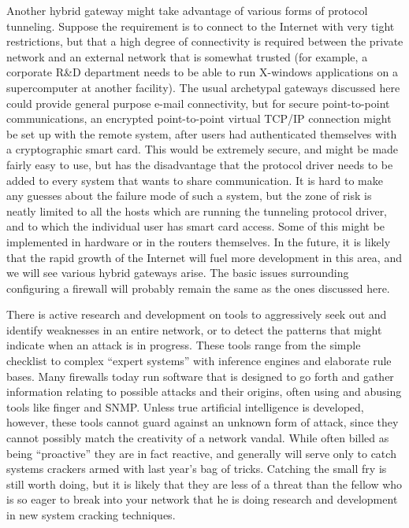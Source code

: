 \begin{htmllist}
    Another hybrid gateway might take advantage of various forms of
    protocol tunneling. Suppose the requirement is to connect to the
    Internet with very tight restrictions, but that a high degree of
    connectivity is required between the private network and an external
    network that is somewhat trusted (for example, a corporate R\&D
    department needs to be able to run X-windows applications on a
    supercomputer at another facility). The usual archetypal gateways
    discussed here could provide general purpose e-mail connectivity, but
    for secure point-to-point communications, an encrypted point-to-point
    virtual TCP/IP connection might be set up with the remote system, after
    users had authenticated themselves with a cryptographic smart card.
    This would be extremely secure, and might be made fairly easy to use,
    but has the disadvantage that the protocol driver needs to be added to
    every system that wants to share communication. It is hard to make any
    guesses about the failure mode of such a system, but the zone of risk
    is neatly limited to all the hosts which are running the tunneling
    protocol driver, and to which the individual user has smart card
    access. Some of this might be implemented in hardware or in the routers
    themselves. In the future, it is likely that the rapid growth of the
    Internet will fuel more development in this area, and we will see
    various hybrid gateways arise. The basic issues surrounding configuring
    a firewall will probably remain the same as the ones discussed here.


    
    There is active research and development on tools to aggressively seek
    out and identify weaknesses in an entire network, or to detect the
    patterns that might indicate when an attack is in progress. These tools
    range from the simple checklist to complex ``expert systems'' with
    inference engines and elaborate rule bases. Many firewalls today run
    software that is designed to go forth and gather information relating
    to possible attacks and their origins, often using and abusing tools
    like finger and SNMP. Unless true artificial intelligence is developed,
    however, these tools cannot guard against an unknown form of attack,
    since they cannot possibly match the creativity of a network vandal.
    While often billed as being ``proactive'' they are in fact reactive,
    and generally will serve only to catch systems crackers armed with last
    year's bag of tricks. Catching the small fry is still worth doing, but
    it is likely that they are less of a threat than the fellow who is so
    eager to break into your network that he is doing research and
    development in new system cracking techniques.
\end{htmllist}

